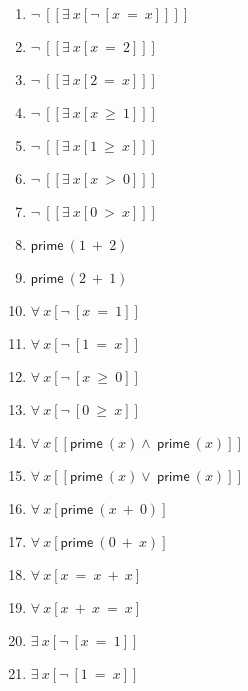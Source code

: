 \documentclass{article}
\begin{document}
\begin{enumerate}
\item $\neg \ [[\exists \ x[\neg \ [x \ = \ x]]]]$

\item $\neg \ [[\exists \ x[x \ = \ 2]]]$

\item $\neg \ [[\exists \ x[2 \ = \ x]]]$

\item $\neg \ [[\exists \ x[x \ \ge \ 1]]]$

\item $\neg \ [[\exists \ x[1 \ \ge \ x]]]$

\item $\neg \ [[\exists \ x[x \ > \ 0]]]$

\item $\neg \ [[\exists \ x[0 \ > \ x]]]$

\item $\mathsf{prime} \ (1 \ + \ 2)$

\item $\mathsf{prime} \ (2 \ + \ 1)$

\item $\forall \ x[\neg \ [x \ = \ 1]]$

\item $\forall \ x[\neg \ [1 \ = \ x]]$

\item $\forall \ x[\neg \ [x \ \ge \ 0]]$

\item $\forall \ x[\neg \ [0 \ \ge \ x]]$

\item $\forall \ x[[\mathsf{prime} \ (x)\wedge \ \mathsf{prime} \ (x)]]$

\item $\forall \ x[[\mathsf{prime} \ (x)\lor \ \mathsf{prime} \ (x)]]$

\item $\forall \ x[\mathsf{prime} \ (x \ + \ 0)]$

\item $\forall \ x[\mathsf{prime} \ (0 \ + \ x)]$

\item $\forall \ x[x \ = \ x \ + \ x]$

\item $\forall \ x[x \ + \ x \ = \ x]$

\item $\exists \ x[\neg \ [x \ = \ 1]]$

\item $\exists \ x[\neg \ [1 \ = \ x]]$


\end{enumerate}
\end{document}
